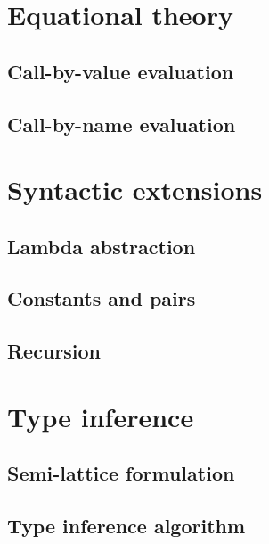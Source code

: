 \section{Equational theory}
\label{sec:flat-syntax}

\subsection{Call-by-value evaluation}
\subsection{Call-by-name evaluation}


\section{Syntactic extensions}
\label{sec:flat-exts}

\subsection{Lambda abstraction}
\subsection{Constants and pairs}
\subsection{Recursion}


\section{Type inference}
\label{sec:flat-inference}

\subsection{Semi-lattice formulation}
\subsection{Type inference algorithm}


